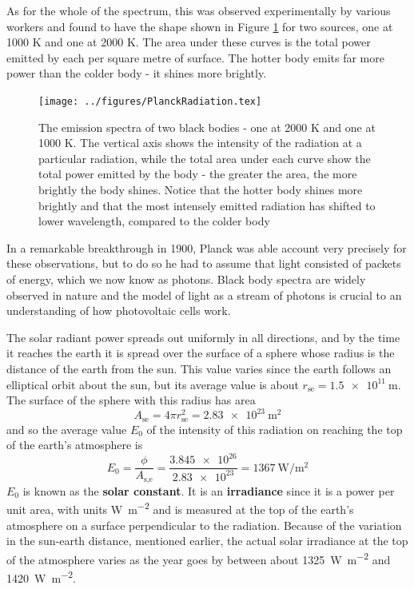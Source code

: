 \documentclass[class=scrartcl, crop=false,parskip=half,]{standalone}
\begin{document}
As for the whole of the spectrum, this was observed experimentally by various workers and found to have the shape shown in Figure \ref{fig:bb_spectra} for two sources, one at 1000 K and one at 2000 K. The area under these curves is the total power emitted by each per square metre of surface. The hotter body emits far more power than the colder body - it shines more brightly.
\begin{figure}
\centering
\texttt{[image: ../figures/PlanckRadiation.tex]}
\caption{The emission spectra of two black bodies - one at 2000 K and one at 1000 K. The vertical axis shows the intensity of the radiation at a particular radiation, while the total area under each curve show the total power emitted by the body - the greater the area, the more brightly the body shines. Notice that the hotter body shines more brightly and that the most intensely emitted radiation has shifted to lower wavelength, compared to the colder body}
\label{fig:bb_spectra}
\end{figure}
In a remarkable breakthrough in 1900, Planck was able account very precisely for these observations, but to do so he had to assume that light consisted of packets of energy, which we now know as photons. Black body spectra are widely observed in nature and the model of light as a stream of photons is crucial to an understanding of how photovoltaic cells work.

The solar radiant power spreads out uniformly in all directions, and by the time it reaches the earth it is spread over the surface of a sphere whose radius is the distance of the earth from the sun. This value varies since the earth follows an elliptical orbit about the sun, but its average value is about $r_\text{{se}}=\SI{1.5e11}{\metre}$. The surface of the sphere with this radius has area 
\begin{equation}\label{earthsSphereRadius}
A_\text{{se}}=4\pi r_\text{{se}}^2 = \SI{2.83e23}{\m\squared}
\end{equation}
and so the average value $E_0$ of the intensity of this radiation on reaching the top of the earth's atmosphere is
\begin{equation}\label{SolarConstant}
E_0=\frac{\phi}{A_\text{{s,e}}}=\frac{\num{3.845e26}}{\num{2.83e23}} =\SI{1367}{\watt\per\metre\squared}
\end{equation}
$E_0$ is known as the \textbf{solar constant}. It is an \textbf{irradiance} since it is a power per unit area, with units \si{\watt\per\metre\squared} and is measured at the top of the earth's atmosphere on a surface perpendicular to the radiation. Because of the variation in the sun-earth distance, mentioned earlier, the actual solar irradiance at the top of the atmosphere varies as the year goes by between about \SI{1325}{\watt\per\metre\squared} and \SI{1420}{\watt\per\metre\squared}.
\end{document}
